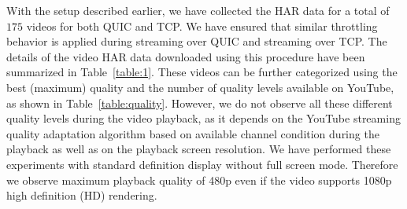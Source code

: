 With the setup described earlier, we have collected the HAR data for a total of $175$ videos for both QUIC and TCP. We have ensured that similar throttling behavior is applied during streaming over QUIC and streaming over TCP. The details of the video HAR data downloaded using this procedure have been summarized in Table~\ref{table:1}. These videos can be further categorized using the best (maximum) quality and the number of quality levels available on YouTube, as shown in Table~\ref{table:quality}. However, we do not observe all these different quality levels during the video playback, as it depends on the YouTube streaming quality adaptation algorithm based on available channel condition during the playback as well as on the playback screen resolution. We have performed these experiments with standard definition display without full screen mode. Therefore we observe maximum playback quality of 480p even if the video supports 1080p high definition (HD) rendering. 




